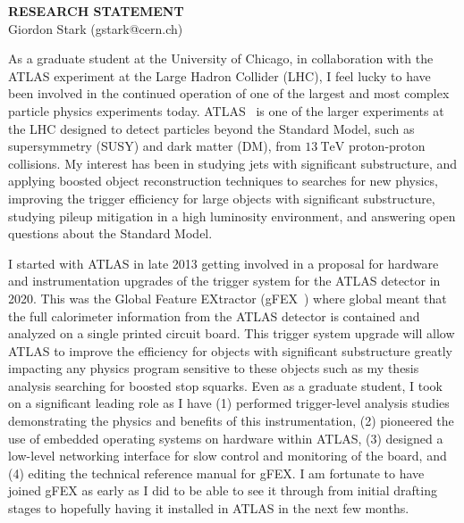 \documentclass[letterpaper, 10pt]{article}
\begin{document}
\thispagestyle{fancy}
\lhead{}
\rhead{}
\renewcommand{\headrulewidth}{0pt}
\renewcommand{\footrulewidth}{0pt}

\pagestyle{fancy}
\lhead{\textcolor{gray}{\it Giordon Stark}}
\rhead{\textcolor{gray}{\thepage/\totalpages{}}}

\begin{center}
{\LARGE \bf RESEARCH STATEMENT}\\
\vspace*{0.1cm}
{\normalsize Giordon Stark (gstark@cern.ch)}
\end{center}

As a graduate student at the University of Chicago, in collaboration with the ATLAS experiment at the Large Hadron Collider (LHC), I feel lucky to have been involved in the continued operation of one of the largest and most complex particle physics experiments today. ATLAS~ is one of the larger experiments at the LHC designed to detect particles beyond the Standard Model, such as supersymmetry (SUSY) and dark matter (DM), from $\SI{13}{\tera\electronvolt}$ proton-proton collisions. My interest has been in studying jets with significant substructure, and applying boosted object reconstruction techniques to searches for new physics, improving the trigger efficiency for large objects with significant substructure, studying pileup mitigation in a high luminosity environment, and answering open questions about the Standard Model.

I started with ATLAS in late 2013 getting involved in a proposal for hardware and instrumentation upgrades of the trigger system for the ATLAS detector in 2020. This was the Global Feature EXtractor (gFEX~) where global meant that the full calorimeter information from the ATLAS detector is contained and analyzed on a single printed circuit board. This trigger system upgrade will allow ATLAS to improve the efficiency for objects with significant substructure greatly impacting any physics program sensitive to these objects such as my thesis analysis searching for boosted stop squarks. Even as a graduate student, I took on a significant leading role as I have (1) performed trigger-level analysis studies demonstrating the physics and benefits of this instrumentation, (2) pioneered the use of embedded operating systems on hardware within ATLAS, (3) designed a low-level networking interface for slow control and monitoring of the board, and (4) editing the technical reference manual for gFEX. I am fortunate to have joined gFEX as early as I did to be able to see it through from initial drafting stages to hopefully having it installed in ATLAS in the next few months.
\end{document}
